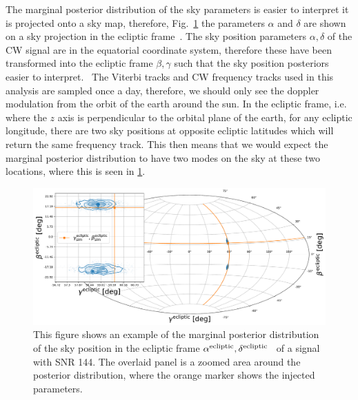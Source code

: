 The marginal posterior distribution of the sky parameters is easier to
interpret it is projected onto a sky map, therefore,
Fig.~\ref{par_est:results:example_skypos} the parameters $\alpha$ and $\delta$
are shown on a sky projection in the ecliptic frame~. The sky
position parameters $\alpha,\delta$ of the \gls{CW} signal are in the
equatorial coordinate system, therefore these have been transformed into the
ecliptic frame $\beta,\gamma$ such that the sky position posteriors easier to
interpret.~ The Viterbi tracks and \gls{CW} frequency tracks used in this
analysis are sampled once a day, therefore, we should only see the doppler
modulation from the orbit of the earth around the sun.  In the ecliptic frame,
i.e. where the $z$ axis is perpendicular to the orbital plane of the earth, for
any ecliptic longitude, there are two sky positions at opposite ecliptic
latitudes which will return the same frequency track.  This then means that we
would expect the marginal posterior distribution to have two modes on the sky
at these two locations, where this is seen in
\ref{par_est:results:example_skypos}.
%
\begin{figure}[ht]
    \centering
    \includegraphics[width=\linewidth]{C5_parameter/skypos_ecliptic.pdf}
    \caption[Example of posterior of sky position in ecliptic frame]{This
figure shows an example of the marginal posterior distribution of the sky
position in the ecliptic frame
$\alpha^{\rm{ecliptic}},\delta^{\rm{ecliptic}}$~ of a signal with \gls{SNR} 144. The
overlaid panel is a zoomed area around the posterior distribution, where the
orange marker shows the injected parameters.~} \label{par_est:results:example_skypos}   
\end{figure}
%

